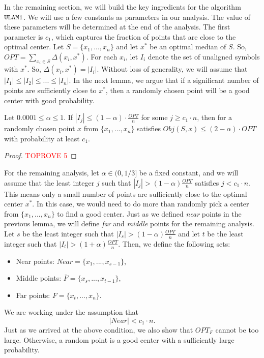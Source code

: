 \documentclass[11pt]{llncs}
\begin{document}
In the remaining section, we will build the key ingredients for the algorithm ${\tt ULAM1}$.
We will use a few constants as parameters in our analysis. 
The value of these parameters will be determined at the end of the analysis.
The first parameter is $c_1$, which captures the fraction of points that are close to the optimal center.
Let $S = \{x_1, ..., x_n\}$
and let $x^{*}$ be an optimal median of $S$. So, $OPT = \sum_{x_i \in S} \Delta(x_i, x^{*})$. 
For each $x_i$, let $I_i$ denote the set of unaligned symbols with $x^{*}$. So, $\Delta(x_i, x^*) = |I_i|$. 
Without loss of generality, we will assume that $|I_1| \leq |I_2| \leq ... \leq |I_n|$. 
In the next lemma, we argue that if a significant number of points are sufficiently close to $x^*$, then a randomly chosen point will be a good center with good probability. 

\begin{lemma}\label{lemma:1}
Let $0.0001 \leq \alpha \leq 1$.
If $|I_j| \leq (1 - \alpha) \cdot \frac{OPT}{n}$ for some $j \geq c_1 \cdot n$, then for a randomly chosen point $x$ from $\{x_1, ..., x_n\}$ satisfies $Obj(S, x) \leq (2 - \alpha) \cdot OPT$ with probability at least $c_1$.
\end{lemma}
\begin{proof}\textcolor{red}{TOPROVE 5}\end{proof}

For the remaining analysis, let $\alpha \in (0, 1/3]$ be a fixed constant, and we will assume that the least integer $j$ such that $|I_j| > (1-\alpha) \frac{OPT}{n}$ satisfies $j < c_1 \cdot n$. 
This means only a small number of points are sufficiently close to the optimal center $x^*$. 
In this case, we would need to do more than randomly pick a center from $\{x_1, ..., x_n\}$ to find a good center.
Just as we defined {\em near} points in the previous lemma, we will define {\em far} and {\em middle} points for the remaining analysis. Let $s$ be the least integer such that $|I_s| > (1 - \alpha) \frac{OPT}{n}$ and let $t$ be the least integer such that $|I_t| > (1 + \alpha) \frac{OPT}{n}$. Then, we define the following sets:
\begin{itemize}
\item Near points: $Near = \{x_1, ..., x_{s-1}\}$,
\item Middle points: $\bar{F} = \{x_s, ..., x_{t-1}\}$,
\item Far points: $F = \{x_t, ..., x_{n}\}$.
\end{itemize}
We are working under the assumption that 
\begin{equation}\label{eqn:assumption-1}
|Near| < c_1 \cdot n.
\end{equation}
Just as we arrived at the above condition, we also show that $OPT_{F}$ cannot be too large. Otherwise, a random point is a good center with a sufficiently large probability.
\end{document}
